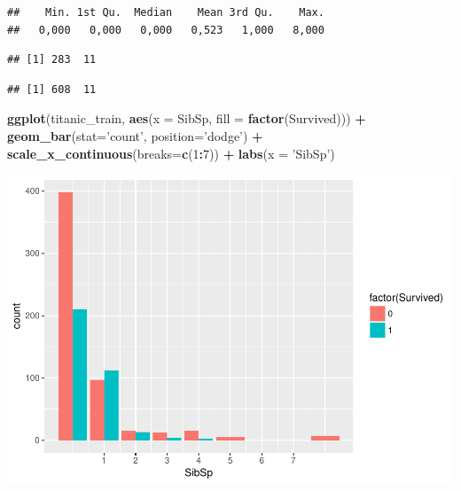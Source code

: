 \documentclass[]{article}
\newenvironment{Shaded}{\begin{snugshade}}{\end{snugshade}}
\newcommand{\KeywordTok}[1]{\textcolor[rgb]{0.13,0.29,0.53}{\textbf{#1}}}
\newcommand{\DataTypeTok}[1]{\textcolor[rgb]{0.13,0.29,0.53}{#1}}
\newcommand{\DecValTok}[1]{\textcolor[rgb]{0.00,0.00,0.81}{#1}}
\newcommand{\StringTok}[1]{\textcolor[rgb]{0.31,0.60,0.02}{#1}}
\newcommand{\OperatorTok}[1]{\textcolor[rgb]{0.81,0.36,0.00}{\textbf{#1}}}
\newcommand{\NormalTok}[1]{#1}
\begin{document}
\begin{verbatim}
##    Min. 1st Qu.  Median    Mean 3rd Qu.    Max. 
##   0,000   0,000   0,000   0,523   1,000   8,000
\end{verbatim}

\begin{Shaded}
\end{Shaded}

\begin{verbatim}
## [1] 283  11
\end{verbatim}

\begin{Shaded}
\end{Shaded}

\begin{verbatim}
## [1] 608  11
\end{verbatim}

\begin{Shaded}
\begin{Highlighting}[]
\KeywordTok{ggplot}\NormalTok{(titanic_train, }\KeywordTok{aes}\NormalTok{(}\DataTypeTok{x =}\NormalTok{ SibSp, }\DataTypeTok{fill =} \KeywordTok{factor}\NormalTok{(Survived))) }\OperatorTok{+}
\StringTok{  }\KeywordTok{geom_bar}\NormalTok{(}\DataTypeTok{stat=}\StringTok{'count'}\NormalTok{, }\DataTypeTok{position=}\StringTok{'dodge'}\NormalTok{) }\OperatorTok{+}
\StringTok{  }\KeywordTok{scale_x_continuous}\NormalTok{(}\DataTypeTok{breaks=}\KeywordTok{c}\NormalTok{(}\DecValTok{1}\OperatorTok{:}\DecValTok{7}\NormalTok{)) }\OperatorTok{+}
\StringTok{  }\KeywordTok{labs}\NormalTok{(}\DataTypeTok{x =} \StringTok{'SibSp'}\NormalTok{)}
\end{Highlighting}
\end{Shaded}

\includegraphics{titanicDataClean_files/figure-latex/var_spouses-1.pdf}
\end{document}
